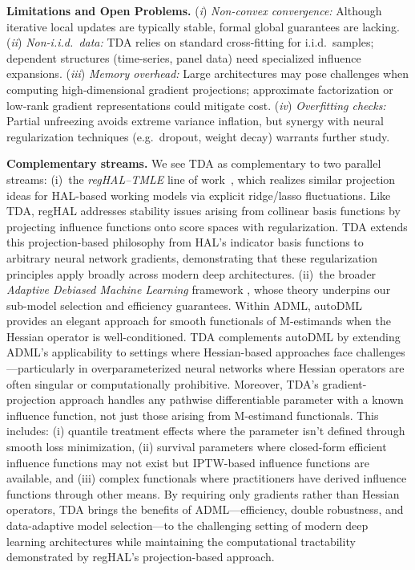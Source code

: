 \documentclass{article}
\theoremstyle{remark}
\begin{document}
\noindent\textbf{Limitations and Open Problems.}
(\textit{i}) \emph{Non-convex convergence:} Although iterative local updates are typically stable, formal global guarantees are lacking.  
(\textit{ii}) \emph{Non-i.i.d.\ data:} TDA relies on standard cross‐fitting for i.i.d.\ samples; dependent structures (time-series, panel data) need specialized influence expansions.  
(\textit{iii}) \emph{Memory overhead:} Large architectures may pose challenges when computing high‐dimensional gradient projections; approximate factorization or low‐rank gradient representations could mitigate cost.  
(\textit{iv}) \emph{Overfitting checks:} Partial unfreezing avoids extreme variance inflation, but synergy with neural regularization techniques (e.g.\ dropout, weight decay) warrants further study.


\noindent\textbf{Complementary streams.} We see TDA as complementary to two parallel streams:
(i)~the \emph{regHAL--TMLE} line of work~\cite{li2025regularized}, which realizes similar projection ideas for HAL-based working models via explicit ridge/lasso fluctuations. Like TDA, regHAL addresses stability issues arising from collinear basis functions by projecting influence functions onto score spaces with regularization. TDA extends this projection-based philosophy from HAL's indicator basis functions to arbitrary neural network gradients, demonstrating that these regularization principles apply broadly across modern deep architectures.
(ii)~the broader \emph{Adaptive Debiased Machine Learning} framework \cite{van2023adaptive}, whose theory underpins our sub-model selection and efficiency guarantees. Within ADML, autoDML~\cite{van2025automatic} provides an elegant approach for smooth functionals of M-estimands when the Hessian operator is well-conditioned. TDA complements autoDML by extending ADML's applicability to settings where Hessian-based approaches face challenges—particularly in overparameterized neural networks where Hessian operators are often singular or computationally prohibitive. Moreover, TDA's gradient-projection approach handles any pathwise differentiable parameter with a known influence function, not just those arising from M-estimand functionals. This includes: (i) quantile treatment effects where the parameter isn't defined through smooth loss minimization, (ii) survival parameters where closed-form efficient influence functions may not exist but IPTW-based influence functions are available, and (iii) complex functionals where practitioners have derived influence functions through other means. By requiring only gradients rather than Hessian operators, TDA brings the benefits of ADML—efficiency, double robustness, and data-adaptive model selection—to the challenging setting of modern deep learning architectures while maintaining the computational tractability demonstrated by regHAL's projection-based approach.
\end{document}
